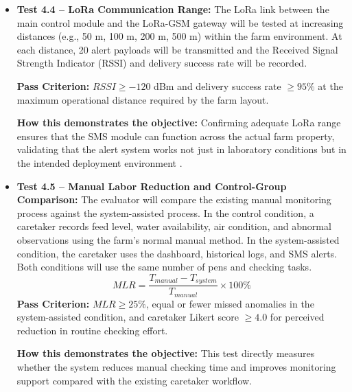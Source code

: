 \begin{itemize}
  \item \textbf{Test 4.4 -- LoRa Communication Range:} The LoRa link between the main control module and the LoRa-GSM gateway will be tested at increasing distances (e.g., 50 m, 100 m, 200 m, 500 m) within the farm environment. At each distance, 20 alert payloads will be transmitted and the Received Signal Strength Indicator (RSSI) and delivery success rate will be recorded.

    \textbf{Pass Criterion:} $RSSI \geq -120$ dBm and delivery success rate $\geq 95\%$ at the maximum operational distance required by the farm layout.

    \textbf{How this demonstrates the objective:} Confirming adequate LoRa range ensures that the SMS module can function across the actual farm property, validating that the alert system works not just in laboratory conditions but in the intended deployment environment \cite{beyondtech2025smart,reza2025review}.

  \item \textbf{Test 4.5 -- Manual Labor Reduction and Control-Group Comparison:} The evaluator will compare the existing manual monitoring process against the system-assisted process. In the control condition, a caretaker records feed level, water availability, air condition, and abnormal observations using the farm's normal manual method. In the system-assisted condition, the caretaker uses the dashboard, historical logs, and SMS alerts. Both conditions will use the same number of pens and checking tasks.
    \begin{equation}
      MLR = \frac{T_{manual} - T_{system}}{T_{manual}} \times 100\%
    \end{equation}
    \textbf{Pass Criterion:} $MLR \geq 25\%$, equal or fewer missed anomalies in the system-assisted condition, and caretaker Likert score $\geq 4.0$ for perceived reduction in routine checking effort.

    \textbf{How this demonstrates the objective:} This test directly measures whether the system reduces manual checking time and improves monitoring support compared with the existing caretaker workflow.
\end{itemize}

